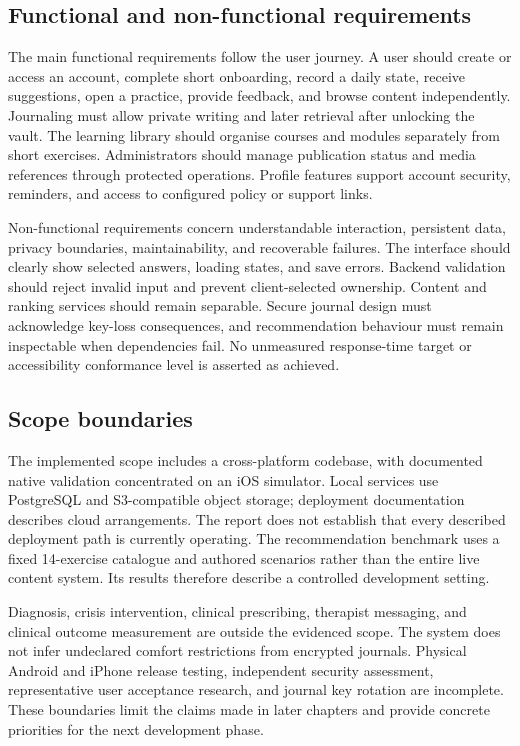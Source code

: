 \subsection{Functional and non-functional requirements}

The main functional requirements follow the user journey. A user should create or access an account, complete short onboarding, record a daily state, receive suggestions, open a practice, provide feedback, and browse content independently. Journaling must allow private writing and later retrieval after unlocking the vault. The learning library should organise courses and modules separately from short exercises. Administrators should manage publication status and media references through protected operations. Profile features support account security, reminders, and access to configured policy or support links.

Non-functional requirements concern understandable interaction, persistent data, privacy boundaries, maintainability, and recoverable failures. The interface should clearly show selected answers, loading states, and save errors. Backend validation should reject invalid input and prevent client-selected ownership. Content and ranking services should remain separable. Secure journal design must acknowledge key-loss consequences, and recommendation behaviour must remain inspectable when dependencies fail. No unmeasured response-time target or accessibility conformance level is asserted as achieved.

\subsection{Scope boundaries}

The implemented scope includes a cross-platform codebase, with documented native validation concentrated on an iOS simulator. Local services use PostgreSQL and S3-compatible object storage; deployment documentation describes cloud arrangements. The report does not establish that every described deployment path is currently operating. The recommendation benchmark uses a fixed 14-exercise catalogue and authored scenarios rather than the entire live content system. Its results therefore describe a controlled development setting.

Diagnosis, crisis intervention, clinical prescribing, therapist messaging, and clinical outcome measurement are outside the evidenced scope. The system does not infer undeclared comfort restrictions from encrypted journals. Physical Android and iPhone release testing, independent security assessment, representative user acceptance research, and journal key rotation are incomplete. These boundaries limit the claims made in later chapters and provide concrete priorities for the next development phase.

